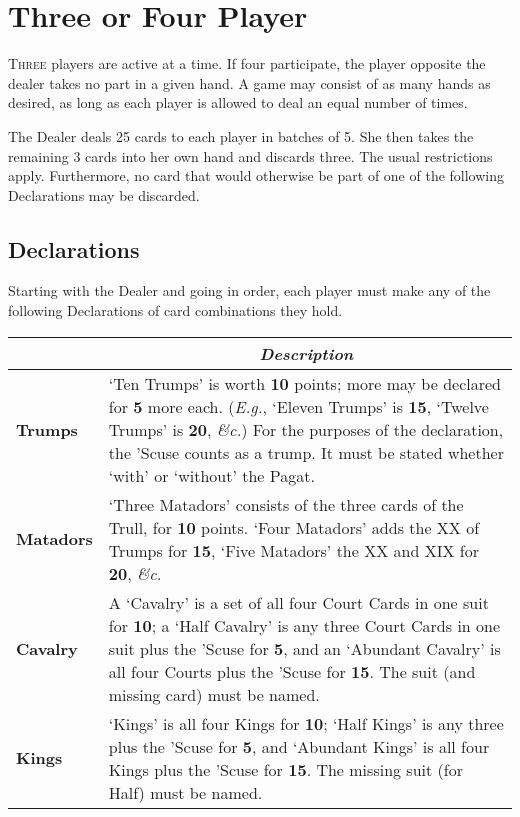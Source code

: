 \documentclass[ebook,12pt,twoside,openright,extrafontsizes,final]{memoir}
\begin{document}
\section{Three or Four Player}
\lettrine{T}{hree} players are active at a time. If four participate, the player opposite
the dealer takes no part in a given hand.  A game may consist of as many hands as desired,
as long as each player is allowed to deal an equal number of times.


The Dealer deals 25 cards to each player in batches of 5.  She then takes the
remaining 3 cards into her own hand and discards three.  The usual restrictions apply. 
Furthermore, no card that would otherwise be part of one of the following Declarations may 
be discarded.

\subsection{Declarations}
Starting with the Dealer and going in order, each player must make any of the following 
Declarations of card combinations they hold.

\begin{longtable}[c]{lp{3in}}
\multicolumn{1}{c}{} & \multicolumn{1}{c}{\textit{Description}} \\
\endfirsthead
\endhead
\textbf{Trumps} & ‘Ten Trumps’ is worth \textbf{10} points; more may be declared for 
\textbf{5} more each. (\emph{E.g.}, ‘Eleven Trumps’ is \textbf{15}, ‘Twelve Trumps’ is 
\textbf{20}, \emph{\&c.})  For the purposes of the declaration, the ’Scuse counts as
a trump. It must be stated whether ‘with’ or ‘without’ the Pagat. \\
\textbf{Matadors} & ‘Three Matadors’ consists of the three cards of the Trull, for 
\textbf{10} points. ‘Four Matadors’ adds the XX of Trumps for \textbf{15}, ‘Five 
Matadors’ the XX and XIX for \textbf{20}, \emph{\&c.} \\
\textbf{Cavalry} & A ‘Cavalry’ is a set of all four Court Cards in one suit for \textbf{10}; 
a ‘Half Cavalry’ is any three Court Cards in one suit plus the ’Scuse for \textbf{5}, and 
an ‘Abundant Cavalry’ is all four Courts plus the ’Scuse for \textbf{15}. The suit (and 
missing card) must be named. \\
\textbf{Kings} & ‘Kings’ is all four Kings for \textbf{10}; ‘Half Kings’ is any three plus 
the ’Scuse for \textbf{5}, and ‘Abundant Kings’ is all four Kings plus the ’Scuse for 
\textbf{15}. The missing suit (for Half) must be named.
\end{longtable}
\end{document}
